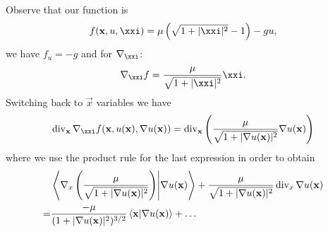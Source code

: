 \documentclass[12pt]{memoir}
\begin{document}
\begin{ptcbr}
    Observe that our function is 
    $$f(\vec x,u,\xxi)=\mu\left(\sqrt{1+|\xxi|^2}-1\right)-gu,$$
    we have $f_u=-g$ and for $\nb_\xxi$:
    $$\nb_\xxi f=\frac{\mu}{\sqrt{1+|\xxi|^2}}\xxi.$$
    Switching back to $\vec x$ variables we have 
    $$\div_{\vec x}\nb_\xxi f(\vec x,u(\vec x),\nb u(\vec x))=\div_{\vec x}\left(\frac{\mu}{\sqrt{1+|\nb u(\vec x)|^2}}\nb u(\vec x)\right)$$
    where we use the product rule for the last expression in order to obtain 
    \begin{align*}
        &\braket{\nabla_x\left(\frac{\mu}{\sqrt{1+|\nabla u(\mathbf{x})|^2}}\right)}{\nabla u(\mathbf{x})}+\frac{\mu}{\sqrt{1+|\nabla u(\mathbf{x})|^2}}\operatorname{div}_x\nabla u(\mathbf{x})\\
        =&\frac{-\mu}{(1+|\nabla u(\mathbf{x})|^2)^{3/2}}\braket{\mathbf{x}}{\nabla u(\mathbf{x})}+\dots
    \end{align*}
    
\end{ptcbr}
\end{document}
